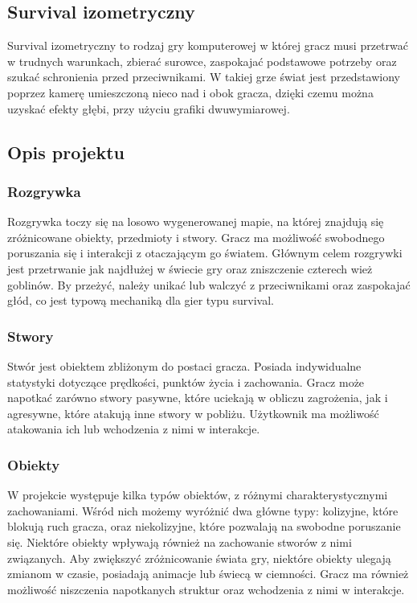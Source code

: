 \documentclass{article}
\begin{document}
\subsection{Survival izometryczny}
Survival izometryczny to rodzaj gry komputerowej w której gracz musi przetrwać w trudnych warunkach, zbierać surowce, zaspokajać podstawowe potrzeby oraz szukać schronienia przed przeciwnikami\cite{wiki:survival}.
W takiej grze świat jest przedstawiony poprzez kamerę umieszczoną nieco nad i obok gracza, dzięki
czemu można uzyskać efekty głębi, przy użyciu grafiki dwuwymiarowej\cite{wiki:2.5D}.
\subsection{Opis projektu}
\subsubsection{Rozgrywka}
Rozgrywka toczy się na losowo wygenerowanej mapie, na której znajdują się zróżnicowane obiekty, przedmioty i stwory. Gracz ma możliwość swobodnego poruszania się i interakcji z otaczającym go światem. Głównym celem rozgrywki jest przetrwanie jak najdłużej w świecie gry oraz zniszczenie czterech wież goblinów. By przeżyć, należy unikać lub walczyć z przeciwnikami oraz zaspokajać głód, co jest typową mechaniką dla gier typu survival.
\subsubsection{Stwory}
Stwór jest obiektem zbliżonym do postaci gracza. Posiada indywidualne statystyki dotyczące prędkości, punktów życia i zachowania. Gracz może napotkać zarówno stwory pasywne, które uciekają w obliczu zagrożenia, jak i agresywne, które atakują inne stwory w pobliżu. Użytkownik ma możliwość atakowania ich lub wchodzenia z nimi w interakcje.
\subsubsection{Obiekty}
W projekcie występuje kilka typów obiektów, z różnymi charakterystycznymi zachowaniami. Wśród nich możemy wyróżnić dwa główne typy: kolizyjne, które blokują ruch gracza, oraz niekolizyjne, które pozwalają na swobodne poruszanie się. Niektóre obiekty wpływają również na zachowanie stworów z nimi związanych. Aby zwiększyć zróżnicowanie świata gry, niektóre obiekty ulegają zmianom w czasie, posiadają animacje lub świecą w ciemności. Gracz ma również możliwość niszczenia napotkanych struktur oraz wchodzenia z nimi w interakcje.
\end{document}

